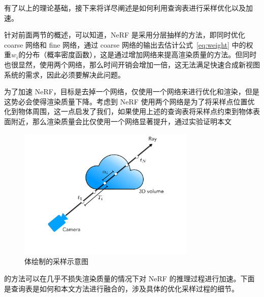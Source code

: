 
有了以上的理论基础，接下来将详尽阐述是如何利用查询表进行采样优化以及加速。

针对前面两节的概述，可以知道，NeRF 是采用分层抽样的方法，即同时优化 coarse 网络和 fine 网络，通过 coarse 网络的输出去估计公式~\ref{eq:weight} 中的权重$\displaystyle w_i$的分布（概率密度函数），这是通过增加网络来提高渲染质量的方法。但同时也很显然，使用两个网络，那么时间开销会增加一倍，这无法满足快速合成新视图系统的需求，因此必须要解决此问题。

为了加速 NeRF，目标是去掉一个网络，仅使用一个网络来进行优化和渲染，但是这势必会使得渲染质量下降。考虑到 NeRF 使用两个网络是为了将采样点位置优化到物体周围，这一点启发了我们，如果使用上述的查询表将采样点约束到物体表面附近，那么渲染质量会比仅使用一个网络显著提升，通过实验证明本文\begin{figure}[b]
	\centering
	\includegraphics[width=0.75\textwidth]{figures/cloud.pdf}
	\caption{体绘制的采样示意图}
	\label{fig:cloud}
\end{figure}\pagebreak 的方法可以在几乎不损失渲染质量的情况下对 NeRF 的推理过程进行加速。下面是查询表是如何和本文方法进行融合的，涉及具体的优化采样过程的细节。



